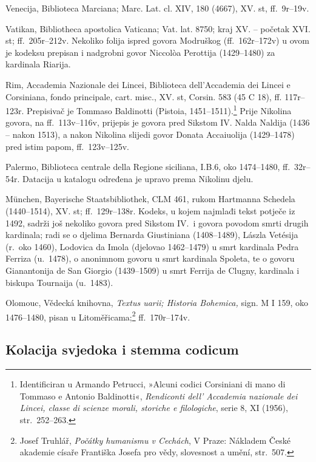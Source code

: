 \documentclass[a5paper,twoside]{article}
\begin{document}
\begin{description}[nolistsep,itemsep=3pt,font=\rmfamily]
\item[ve] Venecija, Biblioteca Marciana; Marc. Lat. cl. XIV, 180 (4667), XV. st, ff.~9r–19v.
\item[va] Vatikan, Bibliotheca apostolica Vaticana; Vat. lat. 8750; kraj XV. – početak XVI. st; ff.~205r–212v. Nekoliko folija ispred govora Modruškog (ff.~162r–172v) u ovom je kodeksu prepisan i nadgrobni govor Niccolòa Perottija (1429–1480) za kardinala Riarija.
\item[co] Rim, Accademia Nazionale dei Lincei, Biblioteca dell'Accademia dei Lincei e Corsiniana, fondo principale, cart. misc., XV. st, Corsin. 583 (45 C 18), ff. 117r–123r. Prepisivač je Tommaso Baldinotti (Pistoia, 1451–1511).\footnote{Identificiran u Armando Petrucci, »Alcuni codici Corsiniani di mano di Tommaso e Antonio Baldinotti«, \textit{Rendiconti dell' Accademia nazionale dei Lincei, classe di scienze morali, storiche e filologiche}, serie 8, XI (1956), str.~252–263.} Prije Nikolina govora, na ff.~113v–116v, prijepis je govora pred Sikstom IV. Nalda Naldija (1436 – nakon 1513), a nakon Nikolina slijedi govor Donata Accaiuolija (1429–1478) pred istim papom, ff.~123v–125v.
\item[pa] Palermo, Biblioteca centrale della Regione siciliana, I.B.6, oko 1474–1480, ff.~32r–54r. Datacija u katalogu određena je upravo prema Nikolinu djelu.
\item[m] München, Bayerische Staatsbibliothek, CLM 461, rukom Hartmanna Schedela (1440–1514), XV. st; ff.~129r–138r. Kodeks, u kojem najmlađi tekst potječe iz 1492, sadrži još nekoliko govora pred Sikstom IV.\ i govora povodom smrti drugih kardinala; radi se o djelima Bernarda Giustiniana (1408–1489), Lászla Vetésija (r.~oko 1460), Lodovica da Imola (djelovao 1462–1479) u smrt kardinala Pedra Ferriza (u.~1478), o anonimnom govoru u smrt kardinala Spoleta, te o govoru Gianantonija de San Giorgio (1439–1509) u smrt Ferrija de Clugny, kardinala i biskupa Tournaija (u.~1483).
\item[o] Olomouc, Vědecká knihovna, \textit{Textus uarii; Historia Bohemica,} sign. M I 159, oko 1476–1480, pisan u Litoměřicama;\footnote{Josef Truhlář, \textit{Počátky humanismu v Cechách}, V Praze: Nákladem České akademie císaře Františka Josefa pro vědy, slovesnost a umění, str.~507.} ff.~170r–174v.
\end{description}

\subsection{Kolacija svjedoka i stemma codicum}
\end{document}
